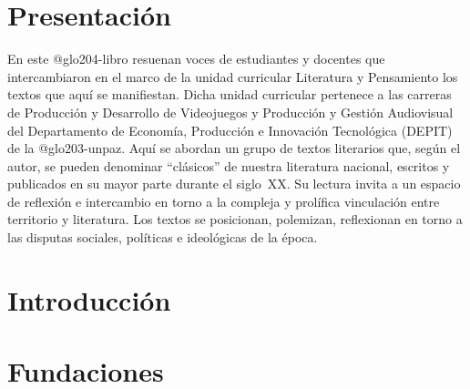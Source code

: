 \chapter{Presentación}

En este \gls{@glo204-libro} resuenan voces de estudiantes y docentes que intercambiaron en el marco de la unidad curricular Literatura y Pensamiento los textos que aquí se manifiestan. Dicha unidad curricular pertenece a las carreras de Producción y Desarrollo de Videojuegos y Producción y Gestión Audiovisual del Departamento de Economía, Producción e Innovación Tecnológica (DEPIT) de la \gls{@glo203-unpaz}. Aquí se abordan un grupo de textos literarios que, según el autor, se pueden denominar \enquote{clásicos} de nuestra literatura nacional, escritos y publicados en su mayor parte durante el siglo~XX. Su lectura invita a un espacio de reflexión e intercambio en torno a la compleja y prolífica vinculación entre territorio y literatura. Los textos se posicionan, polemizan, reflexionan en torno a las disputas sociales, políticas e ideológicas de la época.


\chapter{Introducción}

\mainmatter

\chapter{Fundaciones}

\parencite{@3187-WELLS2014,@3188-SHELLY2023,@3189-QUIROGA2017,@3190-QUIROGA2016}
